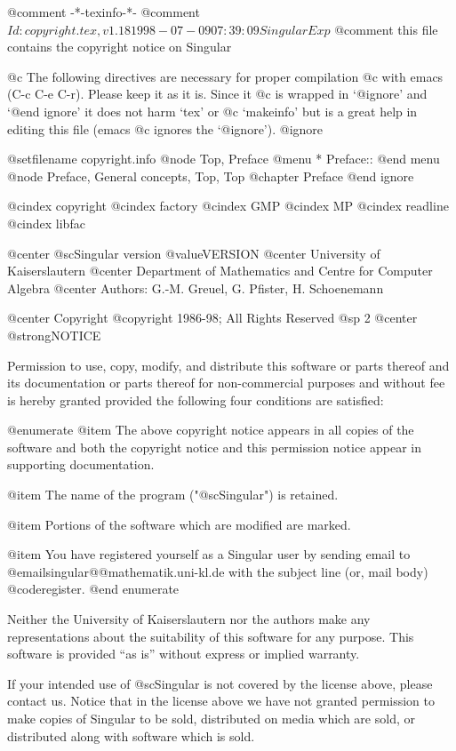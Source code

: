 @comment -*-texinfo-*-
@comment $Id: copyright.tex,v 1.18 1998-07-09 07:39:09 Singular Exp $
@comment this file contains the copyright notice on Singular

@c The following directives are necessary for proper compilation
@c with emacs (C-c C-e C-r).  Please keep it as it is.  Since it
@c is wrapped in `@ignore' and `@end ignore' it does not harm `tex' or
@c `makeinfo' but is a great help in editing this file (emacs
@c ignores the `@ignore').
@ignore

@setfilename copyright.info
@node Top, Preface
@menu
* Preface::
@end menu
@node Preface, General concepts, Top, Top
@chapter Preface
@end ignore

@cindex copyright
@cindex factory
@cindex GMP
@cindex MP
@cindex readline
@cindex libfac

@center @sc{Singular} version @value{VERSION}
@center University of Kaiserslautern
@center Department of Mathematics and Centre for Computer Algebra
@center Authors: G.-M. Greuel, G. Pfister, H. Schoenemann

@center Copyright @copyright{} 1986-98; All Rights Reserved
@sp 2
                                @center @strong{NOTICE}

Permission to use, copy, modify, and distribute this software or parts
thereof and its documentation or parts thereof for non-commercial
purposes and without fee is hereby granted provided the following four
conditions are satisfied:

@enumerate
@item
The above copyright notice appears in all copies of the software
and both the copyright notice and this permission notice
appear in supporting documentation.

@item
The name of the program ("@sc{Singular}") is retained.

@item
Portions of the software which are modified are marked.

@item
You have registered yourself as a Singular user by sending email to
@email{singular@@mathematik.uni-kl.de} with the subject line (or, mail body)
@code{register}.
@end enumerate

Neither the University of Kaiserslautern nor the authors make any
representations about the suitability of this software for any
purpose.  This software is provided ``as is'' without express or
implied warranty.

If your intended use of @sc{Singular} is not covered by the license above,
please contact us.  Notice that in the license above we have not
granted permission to make copies of Singular to be sold, distributed
on media which are sold, or distributed along with software which is
sold.

